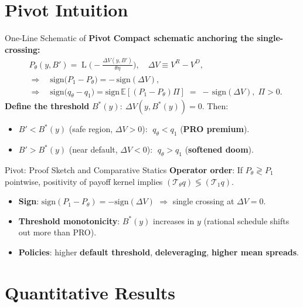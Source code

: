 \documentclass[aspectratio=169,11pt,professionalfonts]{beamer}
\newcommand{\E}{\mathbb{E}}
\newcommand{\1}{\mathbb{1}}
\DeclareMathOperator{\Lsig}{L}
\begin{document}
\section{Pivot Intuition}

\begin{frame}{One-Line Schematic of \textbf{Pivot}}
  \textbf{Compact schematic anchoring the single-crossing:}
  \begin{align*}
     & P_{\theta}(y,B')=\Lsig\!\Big(-\tfrac{\Delta V(y,B')}{\theta\eta}\Big),\quad \Delta V\equiv V^R{-}V^D,                                     \\
     & \Rightarrow\quad \mathrm{sign}\big( P_1{-}P_{\theta}\big)=-\,\mathrm{sign}(\Delta V),                                                     \\
     & \Rightarrow\quad \mathrm{sign}\big(q_{\theta}{-}q_1\big)=\mathrm{sign}\,\E[(P_1{-}P_{\theta})\Pi]\;=\;-\,\mathrm{sign}(\Delta V),\;\Pi>0.
  \end{align*}
  \textbf{Define the threshold} $B^*(y):\ \Delta V(y,B^*(y))=0$. Then:
  \begin{itemize}
    \item \textbf{$B' < B^*(y)$} (safe region, $\Delta V>0$): $\;q_{\theta}<q_1$ (\textbf{PRO premium}).
    \item \textbf{$B' > B^*(y)$} (near default, $\Delta V<0$): $\;q_{\theta}>q_1$ (\textbf{softened doom}).
  \end{itemize}
\end{frame}

\begin{frame}{Pivot: Proof Sketch and Comparative Statics}
  \textbf{Operator order}: If $P_{\theta}\gtrless P_1$ pointwise, positivity of payoff kernel implies $(\mathcal T_{\theta} q)\lessgtr (\mathcal T_1 q)$.
  \begin{itemize}
    \item \textbf{Sign}: $\mathrm{sign}(P_1-P_{\theta})=-\mathrm{sign}(\Delta V)$ $\Rightarrow$ single crossing at $\Delta V{=}0$.
    \item \textbf{Threshold monotonicity}: $B^*(y)$ increases in $y$ (rational schedule shifts out more than PRO).
    \item \textbf{Policies}: higher \textbf{default threshold}, \textbf{deleveraging}, \textbf{higher mean spreads}.
  \end{itemize}
\end{frame}

\section{Quantitative Results}
\end{document}
